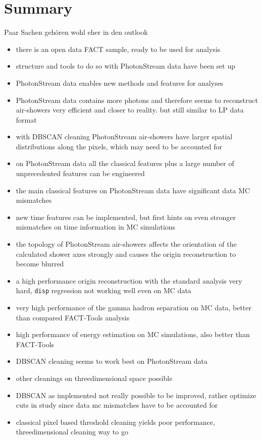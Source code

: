 \chapter{Summary}\label{ch:summary}
%
Paar Sachen gehören wohl eher in den outlook
\begin{itemize}
  \item there is an open data FACT sample, ready to be used for analysis
  \item structure and tools to do so with PhotonStream data have been set up
  \item PhotonStream data enables new methods and features for analyses
  \item PhotonStream data contains more photons and therefore seems to reconstruct air-showers very efficient and closer to reality. but still similar to LP data format
  \item with DBSCAN cleaning PhotonStream air-showers have larger spatial distributions along the pixels, which may need to be accounted for
  \item on PhotonStream data all the classical features plus a large number of unprecedented features can be engineered
  \item the main classical features on PhotonStream data have significant data MC mismatches
  \item new time features can be implemented, but first hints on even stronger mismatches on time information in MC simulations
  \item the topology of PhotonStream air-showers affects the orientation of the calculated shower axes strongly and causes the origin reconstruction to become blurred
  \item a high performance origin reconstruction with the standard analysis very hard, \texttt{disp} regression not working well even on MC data
  \item very high performance of the gamma hadron separation on MC data, better than compared FACT-Tools analysis
  \item high performance of energy estimation on MC simulations, also better than FACT-Tools
  \item DBSCAN cleaning seems to work best on PhotonStream data
  \item other cleanings on threedimensional space possible
  \item DBSCAN as implemented not really possible to be improved, rather optimize cuts in study since data mc mismatches have to be accounted for
  \item classical pixel based threshold cleaning yields poor performance, threedimensional cleaning way to go
\end{itemize}
